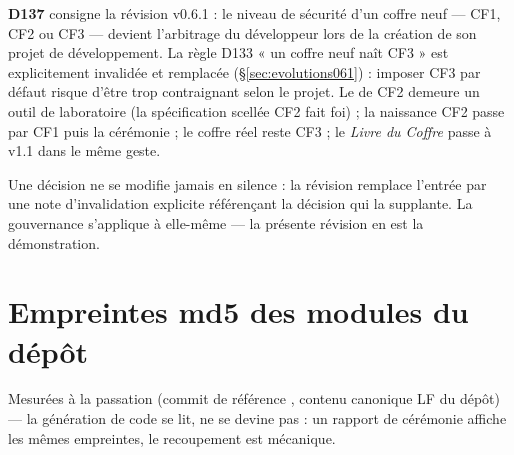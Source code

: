 \textbf{D137} consigne la révision v0.6.1 : le niveau de sécurité d'un coffre neuf —
CF1, CF2 ou CF3 — devient l'arbitrage du développeur lors de la création de son projet
de développement. La règle D133 « un coffre neuf naît CF3 » est explicitement
invalidée et remplacée (§\ref{sec:evolutions061}) : imposer CF3 par défaut risque
d'être trop contraignant selon le projet. Le  de CF2 demeure un outil de
laboratoire (la spécification scellée CF2 fait foi) ; la naissance CF2 passe par
 CF1 puis la cérémonie  ; le coffre réel reste CF3 ; le
\emph{Livre du Coffre} passe à v1.1 dans le même geste.

Une décision ne se modifie jamais en silence : la révision remplace l'entrée par une note
d'invalidation explicite référençant la décision qui la supplante. La gouvernance
s'applique à elle-même — la présente révision en est la démonstration.

\appendix
\section{Empreintes md5 des modules du dépôt}\label{sec:empreintes}

Mesurées à la passation (commit de référence , contenu canonique LF du
dépôt) — la génération de code se lit, ne se devine pas : un rapport de cérémonie
affiche les mêmes empreintes, le recoupement est mécanique.

